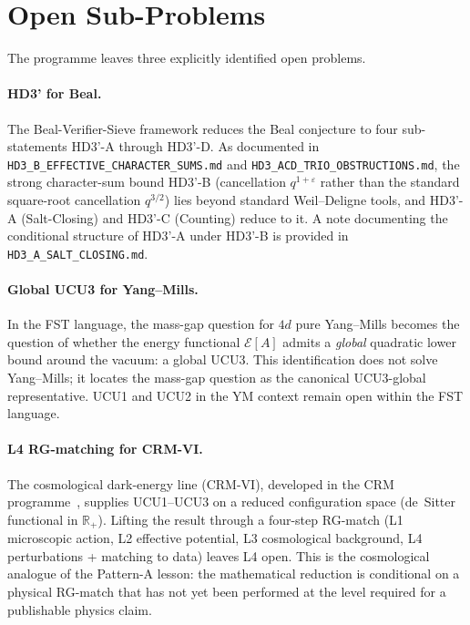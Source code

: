 \documentclass[11pt,a4paper]{article}
\theoremstyle{remark}
\begin{document}
\section{Open Sub-Problems}
\label{sec:open}

The programme leaves three explicitly identified open problems.

\paragraph{HD3' for Beal.}
The Beal-Verifier-Sieve framework reduces the Beal conjecture to four
sub-statements HD3'-A through HD3'-D. As documented in
\texttt{HD3\_B\_EFFECTIVE\_CHARACTER\_SUMS.md} and
\texttt{HD3\_ACD\_TRIO\_OBSTRUCTIONS.md}, the strong character-sum
bound HD3'-B (cancellation $q^{1+\varepsilon}$ rather than the
standard square-root cancellation $q^{3/2}$) lies beyond standard
Weil--Deligne tools, and HD3'-A (Salt-Closing) and HD3'-C (Counting)
reduce to it. A note documenting the conditional structure of HD3'-A
under HD3'-B is provided in \texttt{HD3\_A\_SALT\_CLOSING.md}.

\paragraph{Global UCU3 for Yang--Mills.}
In the FST language, the mass-gap question for $4d$ pure Yang--Mills
becomes the question of whether the energy functional
$\mathcal{E}[A]$ admits a \emph{global} quadratic lower bound around
the vacuum: a global UCU3. This identification does not solve
Yang--Mills; it locates the mass-gap question as the canonical
UCU3-global representative. UCU1 and UCU2 in the YM context remain
open within the FST language.

\paragraph{L4 RG-matching for CRM-VI.}
The cosmological dark-energy line (CRM-VI), developed in the CRM
programme~\cite{GeigerCRM2026}, supplies UCU1--UCU3 on a
reduced configuration space (de~Sitter functional in
$\mathbb{R}_+$). Lifting the result through a four-step RG-match
(L1 microscopic action, L2 effective potential, L3 cosmological
background, L4 perturbations + matching to data) leaves L4 open.
This is the cosmological analogue of the Pattern-A lesson: the
mathematical reduction is conditional on a physical RG-match that
has not yet been performed at the level required for a publishable
physics claim.
\end{document}
